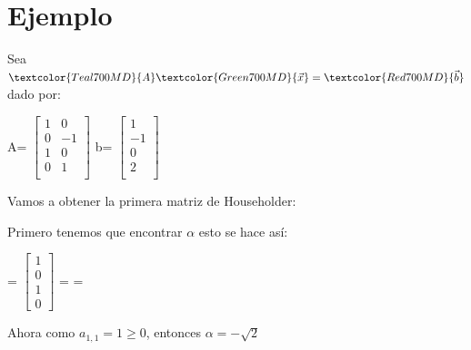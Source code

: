 \documentclass[12pt, fleqn]{report}                             %
\def \Eq {equation}                                             %
\newenvironment{MultiLineEquation*}[1]                          %
        {\begin{\Eq*}\begin{alignedat}{#1}}                         %
        {\end{alignedat}\end{\Eq*}}                                 %
\DeclareMathOperator \Space     {\quad}                         %
\theoremstyle{break}                                            %
\newcommand{\Abs}[1]    {\left\lVert #1 \right\lVert}           %
\newcommand{\bVector}[1]                                        %
        { \ensuremath{\begin{bmatrix}#1\end{bmatrix}} }             %
\newcommand{\Color}[2]{\textcolor{#1}{#2}}                      %
\newcommand \ColorMatrixA       {Teal700MD}                     %
\newcommand \ColorVecX          {Green700MD}                    %
\newcommand \ColorVecB          {Red700MD}                      %
\newcommand \MatrixA      {\Color{\ColorMatrixA}{A}}            %
\newcommand \VecX         {\Color{\ColorVecX}{\vec x}}          %
\newcommand \VecB         {\Color{\ColorVecB}{\vec b}}          %
\begin{document}
        
        \clearpage
        \section{Ejemplo}

            Sea $\MatrixA \VecX = \VecB$ dado por:
            \begin{MultiLineEquation*}{3}
                \MatrixA = \bVector{
                    1 & 0   \\
                    0 & -1  \\
                    1 & 0   \\
                    0 & 1   \\ 
                }
                \Space
                \VecB = \bVector{
                    1 \\
                    -1 \\
                    0 \\
                    2 \\
                }
            \end{MultiLineEquation*}

            Vamos a obtener la primera matriz de Householder:

            Primero tenemos que encontrar $\alpha$ esto se hace así:
            \begin{MultiLineEquation*}{3}
                \Abs{\alpha}
                    = \Abs{
                        \bVector{1 \\0 \\1 \\0}
                    }                              
                    =  
                    = 
            \end{MultiLineEquation*}

            Ahora como $a_{1, 1} = 1 \geq 0$, entonces $\alpha = - \sqrt{2}$ 
            
\end{document}
